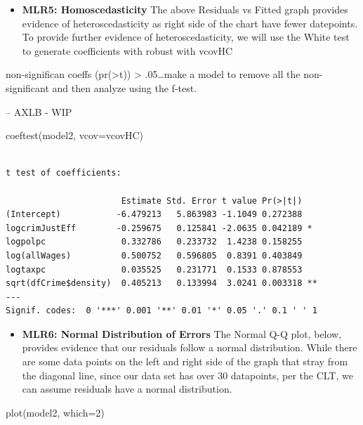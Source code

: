 \documentclass[]{article}
\newenvironment{Shaded}{}{}
\newcommand{\DataTypeTok}[1]{#1}
\newcommand{\DecValTok}[1]{#1}
\newcommand{\KeywordTok}[1]{\textcolor[rgb]{0.00,0.00,1.00}{#1}}
\newcommand{\NormalTok}[1]{#1}
\providecommand{\tightlist}{%
  \setlength{\itemsep}{0pt}\setlength{\parskip}{0pt}}
\begin{document}
\begin{itemize}
\tightlist
\item
  \textbf{MLR5: Homoscedasticity} The above Residuals vs Fitted graph
  provides evidence of heteroscedasticity as right side of the chart
  have fewer datepoints. To provide further evidence of
  heteroscedasticity, we will use the White test to generate
  coefficients with robust with vcovHC
\end{itemize}

non-significan coeffs (pr(\textgreater{}t)) \textgreater{}
.05\ldots{}make a model to remove all the non-significant and then
analyze using the f-test.

-- AXLB - WIP

\begin{Shaded}
\begin{Highlighting}[]
\KeywordTok{coeftest}\NormalTok{(model2, }\DataTypeTok{vcov=}\NormalTok{vcovHC)}
\end{Highlighting}
\end{Shaded}

\begin{verbatim}

t test of coefficients:

                       Estimate Std. Error t value Pr(>|t|)   
(Intercept)           -6.479213   5.863983 -1.1049 0.272388   
logcrimJustEff        -0.259675   0.125841 -2.0635 0.042189 * 
logpolpc               0.332786   0.233732  1.4238 0.158255   
log(allWages)          0.500752   0.596805  0.8391 0.403849   
logtaxpc               0.035525   0.231771  0.1533 0.878553   
sqrt(dfCrime$density)  0.405213   0.133994  3.0241 0.003318 **
---
Signif. codes:  0 '***' 0.001 '**' 0.01 '*' 0.05 '.' 0.1 ' ' 1
\end{verbatim}

\begin{itemize}
\tightlist
\item
  \textbf{MLR6: Normal Distribution of Errors} The Normal Q-Q plot,
  below, provides evidence that our residuals follow a normal
  distribution. While there are some data points on the left and right
  side of the graph that stray from the diagonal line, since our data
  set has over 30 datapoints, per the CLT, we can assume residuals have
  a normal distribution.
\end{itemize}

\begin{Shaded}
\begin{Highlighting}[]
\KeywordTok{plot}\NormalTok{(model2, }\DataTypeTok{which=}\DecValTok{2}\NormalTok{)}
\end{Highlighting}
\end{Shaded}
\end{document}
